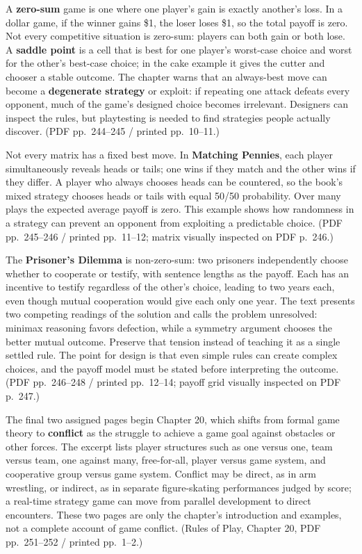 A \textbf{zero-sum} game is one where one player's gain is exactly another's loss. In a dollar game, if the winner gains \$1, the loser loses \$1, so the total payoff is zero. Not every competitive situation is zero-sum: players can both gain or both lose. A \textbf{saddle point} is a cell that is best for one player's worst-case choice and worst for the other's best-case choice; in the cake example it gives the cutter and chooser a stable outcome. The chapter warns that an always-best move can become a \textbf{degenerate strategy} or exploit: if repeating one attack defeats every opponent, much of the game's designed choice becomes irrelevant. Designers can inspect the rules, but playtesting is needed to find strategies people actually discover. (PDF pp.~244--245 / printed pp.~10--11.)

Not every matrix has a fixed best move. In \textbf{Matching Pennies}, each player simultaneously reveals heads or tails; one wins if they match and the other wins if they differ. A player who always chooses heads can be countered, so the book's mixed strategy chooses heads or tails with equal 50/50 probability. Over many plays the expected average payoff is zero. This example shows how randomness in a strategy can prevent an opponent from exploiting a predictable choice. (PDF pp.~245--246 / printed pp.~11--12; matrix visually inspected on PDF p.~246.)

The \textbf{Prisoner's Dilemma} is non-zero-sum: two prisoners independently choose whether to cooperate or testify, with sentence lengths as the payoff. Each has an incentive to testify regardless of the other's choice, leading to two years each, even though mutual cooperation would give each only one year. The text presents two competing readings of the solution and calls the problem unresolved: minimax reasoning favors defection, while a symmetry argument chooses the better mutual outcome. Preserve that tension instead of teaching it as a single settled rule. The point for design is that even simple rules can create complex choices, and the payoff model must be stated before interpreting the outcome. (PDF pp.~246--248 / printed pp.~12--14; payoff grid visually inspected on PDF p.~247.)

The final two assigned pages begin Chapter 20, which shifts from formal game theory to \textbf{conflict} as the struggle to achieve a game goal against obstacles or other forces. The excerpt lists player structures such as one versus one, team versus team, one against many, free-for-all, player versus game system, and cooperative group versus game system. Conflict may be direct, as in arm wrestling, or indirect, as in separate figure-skating performances judged by score; a real-time strategy game can move from parallel development to direct encounters. These two pages are only the chapter's introduction and examples, not a complete account of game conflict. (Rules of Play, Chapter 20, PDF pp.~251--252 / printed pp.~1--2.)

